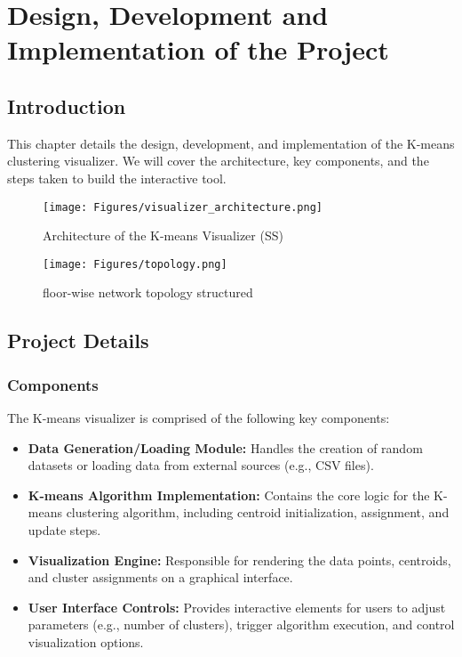 \documentclass[12pt]{report}
\begin{document}
\newpage
\chapter{Design, Development and Implementation of the Project}

\section{Introduction}
This chapter details the design, development, and implementation of the K-means clustering visualizer. We will cover the architecture, key components, and the steps taken to build the interactive tool.
\begin{figure}[h]
        \centering
        \texttt{[image: Figures/visualizer\_architecture.png]}
        \caption{Architecture of the K-means Visualizer (SS)}
\end{figure}
\begin{figure}[h]
        \centering
        \texttt{[image: Figures/topology.png]}
        \caption{floor-wise network topology structured}
\end{figure}
\section{Project Details}

\subsection{Components}
The K-means visualizer is comprised of the following key components:
\begin{itemize}
  \item \textbf{Data Generation/Loading Module:} Handles the creation of random datasets or loading data from external sources (e.g., CSV files).
  \item \textbf{K-means Algorithm Implementation:} Contains the core logic for the K-means clustering algorithm, including centroid initialization, assignment, and update steps.
  \item \textbf{Visualization Engine:} Responsible for rendering the data points, centroids, and cluster assignments on a graphical interface.
  \item \textbf{User Interface Controls:} Provides interactive elements for users to adjust parameters (e.g., number of clusters), trigger algorithm execution, and control visualization options.
\end{itemize}
\end{document}
